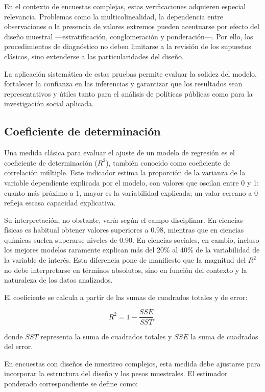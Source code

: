 \documentclass[
  spanish,
  12pt,
]{book}
\begin{document}
En el contexto de encuestas complejas, estas verificaciones adquieren especial relevancia. Problemas como la multicolinealidad, la dependencia entre observaciones o la presencia de valores extremos pueden acentuarse por efecto del diseño muestral ---estratificación, conglomeración y ponderación---. Por ello, los procedimientos de diagnóstico no deben limitarse a la revisión de los supuestos clásicos, sino extenderse a las particularidades del diseño.

La aplicación sistemática de estas pruebas permite evaluar la solidez del modelo, fortalecer la confianza en las inferencias y garantizar que los resultados sean representativos y útiles tanto para el análisis de políticas públicas como para la investigación social aplicada.

\subsection{Coeficiente de determinación}\label{coeficiente-de-determinaciuxf3n}

Una medida clásica para evaluar el ajuste de un modelo de regresión es el coeficiente de determinación (\(R^{2}\)), también conocido como coeficiente de correlación múltiple. Este indicador estima la proporción de la varianza de la variable dependiente explicada por el modelo, con valores que oscilan entre 0 y 1: cuanto más próximo a 1, mayor es la variabilidad explicada; un valor cercano a 0 refleja escasa capacidad explicativa.

Su interpretación, no obstante, varía según el campo disciplinar. En ciencias físicas es habitual obtener valores superiores a 0.98, mientras que en ciencias químicas suelen superarse niveles de 0.90. En ciencias sociales, en cambio, incluso los mejores modelos raramente explican más del 20\% al 40\% de la variabilidad de la variable de interés. Esta diferencia pone de manifiesto que la magnitud del \(R^{2}\) no debe interpretarse en términos absolutos, sino en función del contexto y la naturaleza de los datos analizados.

El coeficiente se calcula a partir de las sumas de cuadrados totales y de error:

\[
R^{2} = 1 - \frac{SSE}{SST},
\]

donde \(SST\) representa la suma de cuadrados totales y \(SSE\) la suma de cuadrados del error.

En encuestas con diseños de muestreo complejos, esta medida debe ajustarse para incorporar la estructura del diseño y los pesos muestrales. El estimador ponderado correspondiente se define como:
\end{document}
